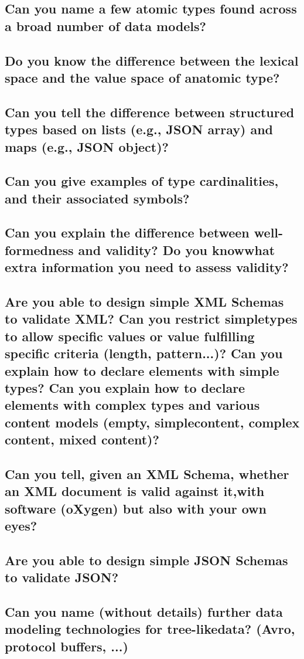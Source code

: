 \documentclass{article}
\begin{document}
\subsection{Can you name a few atomic types found across a broad number of data models?}
\subsection{Do you know the difference between the lexical space and the value space of anatomic type?}
\subsection{Can you tell the difference between structured types based on lists (e.g., JSON array) and maps (e.g., JSON object)?}
\subsection{Can you give examples of type cardinalities, and their associated symbols?}
\subsection{Can you explain the difference between well-formedness and validity? Do you knowwhat extra information you need to assess validity?}
\subsection{Are you able to design simple XML Schemas to validate XML? Can you restrict simpletypes to allow specific values or value fulfilling specific criteria (length, pattern...)? Can you explain how to declare elements with simple types? Can you explain how to declare elements with complex types and various content models (empty, simplecontent, complex content, mixed content)?}
\subsection{Can you tell, given an XML Schema, whether an XML document is valid against it,with software (oXygen) but also with your own eyes?}
\subsection{Are you able to design simple JSON Schemas to validate JSON?}
\subsection{Can you name (without details) further data modeling technologies for tree-likedata? (Avro, protocol buffers, ...)}
\end{document}

